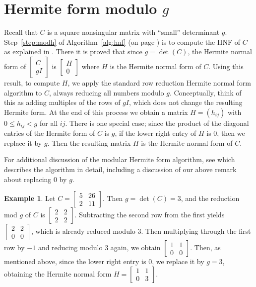 \documentclass[preprint,12pt]{elsarticle}
\theoremstyle{plain}
\theoremstyle{definition}
\newtheorem{example}[theorem]{Example}
\numberwithin{equation}{section}
\numberwithin{figure}{section}
\numberwithin{table}{section}
\begin{document}
\section{Hermite form modulo $g$}\label{sec:hnfmodg}
Recall that $C$ is a square nonsingular matrix with ``small'' determinant $g$.
Step~\ref{step:modh} of Algorithm~\ref{alg:hnf} (on page \pageref{alg:hnf}) is to
compute the HNF of $C$ as explained in \cite[\S3]{DomKan87}. There
it is proved that since $g=\det(C)$, the Hermite normal form of
$\begin{bmatrix}C\\  gI\end{bmatrix}$
is $\begin{bmatrix} H\\ 0\end{bmatrix}$ where $H$ is the Hermite normal
form of $C$.  Using this result, to compute $H$, we apply the standard row reduction
Hermite normal form algorithm to $C$, always reducing all numbers 
modulo $g$. Conceptually, think of this as adding multiples of the rows of $gI$, 
which does not change the resulting Hermite form.
At the end of this process we obtain a matrix $H=(h_{ij})$ with $0\leq h_{ij} < g$ for
all $ij$. There is one special case; since the product of the diagonal entries of the
Hermite form of $C$ is $g$, if the lower right entry of $H$ is $0$, then we replace it by $g$.  
Then the resulting matrix $H$ is the Hermite normal form of $C$. 

For additional discussion of the modular Hermite form algorithm, see
\cite[\S2.4, pg.~71]{cohen:course} which describes the algorithm in
detail, including a discussion of our above remark about replacing
$0$ by $g$.

\begin{example}
Let $C = \begin{bmatrix}5&26\\2&11\end{bmatrix}$.  Then $g=\det(C)=3$, and the
reduction mod $g$ of $C$ is $\begin{bmatrix}2&2\\2&2\end{bmatrix}$.  Subtracting
the second row from the first yields $\begin{bmatrix}2&2\\0&0\end{bmatrix}$, 
which is already reduced modulo $3$.  Then multiplying through the first row
by $-1$ and reducing modulo $3$ again, we obtain $\begin{bmatrix}1&1\\0&0\end{bmatrix}$.
Then, as mentioned above, since the lower right entry is $0$, we replace it
by $g=3$, obtaining the Hermite normal form $H=\begin{bmatrix}1&1\\0&3\end{bmatrix}$. 
\end{example}
\end{document}

